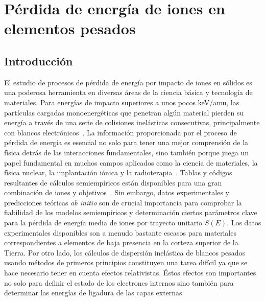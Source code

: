 \chapter{Pérdida de energía de iones en elementos pesados}

\section{Introducción}
\label{sec:intro}

El estudio de procesos de pérdida de energía por impacto de iones 
en sólidos es una poderosa herramienta en diversas áreas de la ciencia
básica y tecnología de materiales. Para energías de impacto superiores 
a unos pocos keV/amu, las partículas cargadas monoenergéticas que 
penetran algún material pierden su energía a través de una serie de 
colisiones inelásticas consecutivas, principalmente con blancos
electrónicos~\cite{Chu:01,Sigmund:06}. La información proporcionada por 
el proceso de pérdida de energía es esencial no solo para tener una 
mejor comprensión de la física detrás de las interacciones fundamentales, 
sino también porque juega un papel fundamental en muchos campos 
aplicados como la ciencia de materiales, la física nuclear, la 
implantación iónica y la radioterapia~\cite{Sigmund:06,Schardt:10}. 
Tablas y códigos resultantes de cálculos semiempíricos están disponibles 
para una gran combinación de iones y objetivos~\cite{iaea_codes,Paul:03}. 
Sin embargo, datos experimentales y predicciones teóricas 
\textit{ab initio} son de crucial importancia para comprobar la 
fiabilidad de los modelos semiempíricos y determinación ciertos 
parámetros clave~\cite{Diwan:15,Damache:04,Damache:02} para la pérdida 
de energía media de iones por trayecto unitario $S(E)$. Los datos 
experimentales disponibles son a menudo bastante escasos para materiales 
correspondientes a elementos de baja presencia en la corteza superior de 
la Tierra. Por otro lado, los cálculos de dispersión inelástica de 
blancos pesados usando métodos de primeros principios constituyen una 
tarea difícil ya que se hace necesario tener en cuenta efectos 
relativistas. Éstos efectos son importantes no solo para definir el 
estado de los electrones internos sino también para determinar las 
energías de ligadura de las capas externas.

